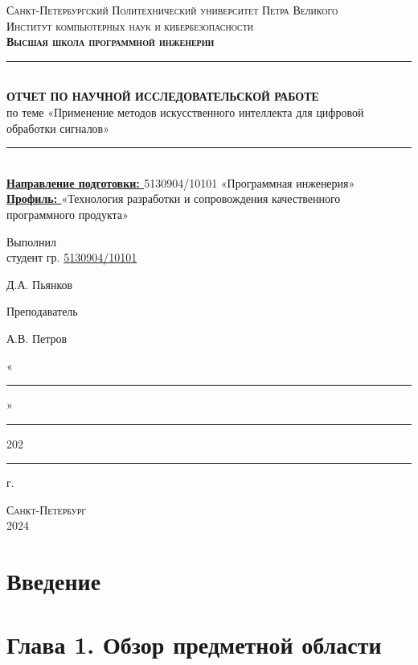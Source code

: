 \documentclass[4paper,12pt]{article}
\begin{document}
	\begin{titlepage}
		\newcommand{\HRule}{\rule{\linewidth}{0.5mm}}
		\center
		\textsc{\large Санкт-Петербургский Политехнический университет Петра Великого}\\[0.2cm]
		\textsc{\large Институт компьютерных наук и кибербезопасности}\\[0.2cm]
		\textsc{\large \textbf{Высшая школа программной инженерии}}\\[0.2cm]
		\vfill\vfill
		\HRule\\[0.4cm]
		{\large\textbf{ОТЧЕТ ПО НАУЧНОЙ ИССЛЕДОВАТЕЛЬСКОЙ РАБОТЕ} \\ по теме «Применение методов искусственного интеллекта для цифровой обработки сигналов»}\\[0.4cm]
		\HRule\\[1.5cm]
		{\large \textbf{\underline{Направление подготовки: }} 5130904/10101 «Программная инженерия» \\}
		{\large \textbf{\underline{Профиль: }} «Технология разработки и сопровождения качественного \\ программного продукта» }
		\vfill\vfill
		
		\par
		\noindent
		\begin{minipage}[t]{0.47\textwidth}
			{\large{ Выполнил\\
					студент гр. \underline{5130904/10101} \\}}
		\end{minipage}
		\hfill
		\begin{minipage}[t]{0.47\textwidth}\raggedleft
			{\large{ Д.А. Пьянков \\}}
		\end{minipage}
		\begin{minipage}[t]{0.47\textwidth}
			{\large{Преподаватель}}
		\end{minipage}
		\hfill
		\begin{minipage}[t]{0.47\textwidth}\raggedleft
			{\large{А.В. Петров\\}}
		\end{minipage}
		\hfill
		
		\begin{minipage}[t]{\textwidth}\raggedleft
			{\large{«\rule{0.6cm}{0.15mm}»  \rule{2.8cm}{0.15mm} 202\rule{0.4cm}{0.15mm}г.\\}}
		\end{minipage}
		
		
		\vfill\vfill\vfill
		\textsc{\large Санкт-Петербург}\\[0.5cm]
		{\large2024}
		\vfill
		
	\end{titlepage}
	
	\tableofcontents
	\newpage
	
	\section{Введение}

	\section{Глава 1. Обзор предметной области}
	
\end{document}
